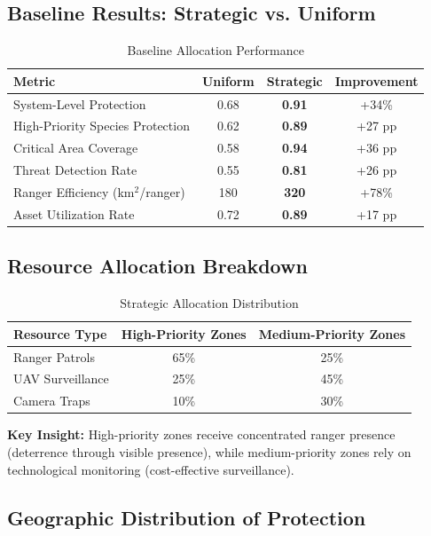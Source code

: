 \subsection{Baseline Results: Strategic vs. Uniform}

\begin{table}[H]
\centering
\caption{Baseline Allocation Performance}
\begin{tabular}{lccc}
\toprule
\textbf{Metric} & \textbf{Uniform} & \textbf{Strategic} & \textbf{Improvement} \\
\midrule
System-Level Protection & 0.68 & \textbf{0.91} & +34\% \\
High-Priority Species Protection & 0.62 & \textbf{0.89} & +27 pp \\
Critical Area Coverage & 0.58 & \textbf{0.94} & +36 pp \\
Threat Detection Rate & 0.55 & \textbf{0.81} & +26 pp \\
Ranger Efficiency (km$^2$/ranger) & 180 & \textbf{320} & +78\% \\
Asset Utilization Rate & 0.72 & \textbf{0.89} & +17 pp \\
\bottomrule
\end{tabular}
\end{table}

\subsection{Resource Allocation Breakdown}

\begin{table}[H]
\centering
\caption{Strategic Allocation Distribution}
\begin{tabular}{lcc}
\toprule
\textbf{Resource Type} & \textbf{High-Priority Zones} & \textbf{Medium-Priority Zones} \\
\midrule
Ranger Patrols & 65\% & 25\% \\
UAV Surveillance & 25\% & 45\% \\
Camera Traps & 10\% & 30\% \\
\bottomrule
\end{tabular}
\end{table}

\noindent \textbf{Key Insight:} High-priority zones receive concentrated ranger presence (deterrence through visible presence), while medium-priority zones rely on technological monitoring (cost-effective surveillance).

\subsection{Geographic Distribution of Protection}

